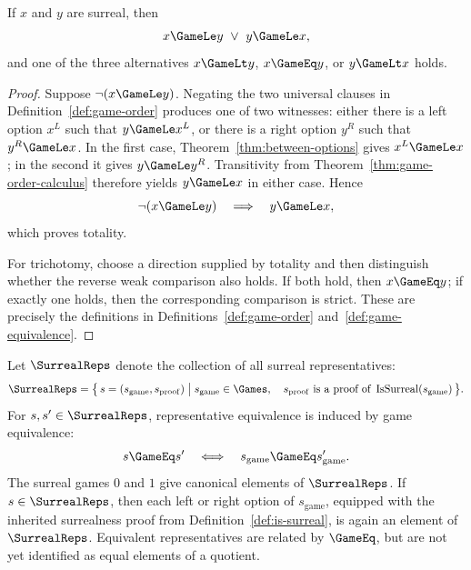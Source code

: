 \begin{theorem}
  \label{thm:surreal-totality}
  \leanok
  If \(x\) and \(y\) are surreal, then
  \[
    x\GameLe y\ \vee\ y\GameLe x,
  \]
  and one of the three alternatives \(x\GameLt y\), \(x\GameEq y\), or
  \(y\GameLt x\) holds.
\end{theorem}
\begin{proof}
  \leanok
  Suppose \(\neg(x\GameLe y)\).  Negating the two universal clauses in
  Definition~\ref{def:game-order} produces one of two witnesses: either there
  is a left option \(x^L\) such that \(y\GameLe x^L\), or there is a right
  option \(y^R\) such that \(y^R\GameLe x\).  In the first case,
  Theorem~\ref{thm:between-options} gives \(x^L\GameLe x\); in the second it
  gives \(y\GameLe y^R\).  Transitivity from
  Theorem~\ref{thm:game-order-calculus} therefore yields \(y\GameLe x\) in
  either case.  Hence
  \[
    \neg(x\GameLe y)\quad\Longrightarrow\quad y\GameLe x,
  \]
  which proves totality.

  For trichotomy, choose a direction supplied by totality and then distinguish
  whether the reverse weak comparison also holds.  If both hold, then
  \(x\GameEq y\); if exactly one holds, then the corresponding comparison is
  strict.  These are precisely the definitions in
  Definitions~\ref{def:game-order} and~\ref{def:game-equivalence}.
\end{proof}

\begin{definition}
  \label{def:surreal-representative}
  \leanok
  Let \(\SurrealReps\) denote the collection of all surreal representatives:
  \[
    \SurrealReps
      =\bigl\{\,s=(s_{\mathrm{game}},s_{\mathrm{proof}})
        \bigm|
        s_{\mathrm{game}}\in\Games,\quad
        s_{\mathrm{proof}}\text{ is a proof of }
        \operatorname{IsSurreal}(s_{\mathrm{game}})\,\bigr\}.
  \]
  For \(s,s'\in\SurrealReps\), representative equivalence is induced by game equivalence:
  \[
    s\GameEq s'
      \quad\Longleftrightarrow\quad
    s_{\mathrm{game}}\GameEq s'_{\mathrm{game}}.
  \]
  The surreal games \(0\) and \(1\) give canonical elements of \(\SurrealReps\).  If
  \(s\in\SurrealReps\), then each left or right option of \(s_{\mathrm{game}}\), equipped with
  the inherited surrealness proof from Definition~\ref{def:is-surreal}, is again an element of
  \(\SurrealReps\).  Equivalent representatives are related by \(\GameEq\), but are not yet
  identified as equal elements of a quotient.
\end{definition}

